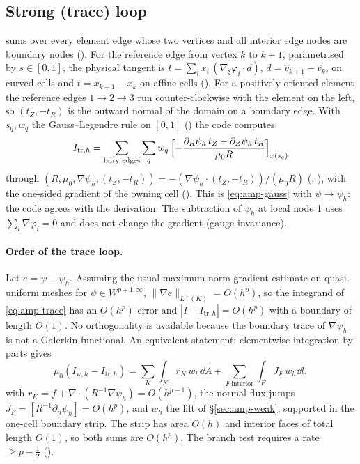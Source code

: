 \subsection{Strong (trace) loop}
 sums over every element edge whose two vertices
and all interior edge nodes are boundary nodes ().
For the reference edge from vertex $k$ to $k{+}1$, parametrised by
$s\in[0,1]$, the physical tangent is
$t=\sum_i x_i\,(\nabla_\xi\varphi_i\cdot d)$, $d=\hat v_{k+1}-\hat v_k$, on
curved cells and $t=x_{k+1}-x_k$ on affine cells
(). For a positively oriented element the
reference edges $1\to2\to3$ run counter-clockwise with the element on the left,
so $(t_Z,-t_R)$ is the outward normal of the domain on a boundary edge.
With $s_q,w_q$ the Gauss--Legendre rule on $[0,1]$ ()
the code computes
\begin{equation}
I_{\mathrm{tr},h}=\sum_{\text{bdry edges}}\sum_q w_q\,
\Bigl[-\frac{\partial_R\psi_h\,t_Z-\partial_Z\psi_h\,t_R}{\mu_0R}\Bigr]_{x(s_q)}
\label{eq:amp-trace}
\end{equation}
through $(R,\mu_0,\nabla\psi_h,(t_Z,-t_R))
=-(\nabla\psi_h\cdot(t_Z,-t_R))/(\mu_0R)$
(,
), with the one-sided gradient of the
owning cell (). This is
\eqref{eq:amp-gauss} with $\psi\to\psi_h$: the code agrees with the derivation.
The subtraction of $\psi_h$ at local node 1 uses
$\sum_i\nabla\varphi_i=0$ and does not change the gradient (gauge invariance).

\paragraph{Order of the trace loop.} Let $e=\psi-\psi_h$. Assuming the usual maximum-norm gradient estimate on quasi-uniform
meshes for $\psi\in W^{p+1,\infty}$, $\|\nabla e\|_{L^\infty(K)}=O(h^p)$, so the
integrand of \eqref{eq:amp-trace} has an $O(h^p)$ error and
$|I-I_{\mathrm{tr},h}|=O(h^p)$ with a boundary of length $O(1)$. No
orthogonality is available because the boundary trace of $\nabla\psi_h$ is not
a Galerkin functional. An equivalent statement: elementwise integration by parts
gives
\begin{equation}
\mu_0(I_{\mathrm w,h}-I_{\mathrm{tr},h})=\sum_K\int_K r_K\,w_h\dd A
+\sum_{F\ \mathrm{interior}}\int_F J_F\,w_h\dd l,
\label{eq:amp-trace-weak}
\end{equation}
with $r_K=f+\nabla\cdot(R^{-1}\nabla\psi_h)=O(h^{p-1})$, the normal-flux jumps
$J_F=[R^{-1}\partial_n\psi_h]=O(h^p)$, and $w_h$ the lift of
\S\ref{sec:amp-weak}, supported in the one-cell boundary strip. The strip has
area $O(h)$ and interior faces of total length $O(1)$, so both sums are
$O(h^p)$. The branch test requires a rate $\ge p-\tfrac12$
().

